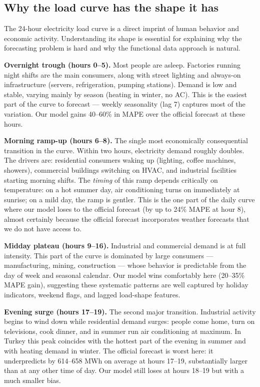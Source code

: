 \documentclass[11pt,a4paper]{article}
\begin{document}
\subsection{Why the load curve has the shape it has}

The 24-hour electricity load curve is a direct imprint of human behavior
and economic activity. Understanding its shape is essential for explaining
why the forecasting problem is hard and why the functional data approach
is natural.

\textbf{Overnight trough (hours 0--5).}
Most people are asleep. Factories running night shifts are the main
consumers, along with street lighting and always-on infrastructure
(servers, refrigeration, pumping stations). Demand is low and stable,
varying mainly by season (heating in winter, no AC). This is the easiest
part of the curve to forecast --- weekly seasonality (lag 7) captures most
of the variation. Our model gains 40--60\% in MAPE over the official
forecast at these hours.

\textbf{Morning ramp-up (hours 6--8).}
The single most economically consequential transition in the curve.
Within two hours, electricity demand roughly doubles. The drivers are:
residential consumers waking up (lighting, coffee machines, showers),
commercial buildings switching on HVAC, and industrial facilities
starting morning shifts. The \emph{timing} of this ramp depends
critically on temperature: on a hot summer day, air conditioning turns
on immediately at sunrise; on a mild day, the ramp is gentler.
This is the one part of the daily curve where our model loses to the
official forecast (by up to 24\% MAPE at hour 8), almost certainly
because the official forecast incorporates weather forecasts that
we do not have access to.

\textbf{Midday plateau (hours 9--16).}
Industrial and commercial demand is at full intensity.
This part of the curve is dominated by large consumers ---
manufacturing, mining, construction --- whose behavior is
predictable from the day of week and seasonal calendar.
Our model wins comfortably here (20--35\% MAPE gain),
suggesting these systematic patterns are well captured by
holiday indicators, weekend flags, and lagged load-shape features.

\textbf{Evening surge (hours 17--19).}
The second major transition. Industrial activity begins to wind
down while residential demand surges: people come home, turn on
televisions, cook dinner, and in summer run air conditioning at
maximum. In Turkey this peak coincides with the hottest part of
the evening in summer and with heating demand in winter. The official
forecast is worst here: it underpredicts by 614--658 MWh on average
at hours 17--19, substantially larger than at any other time of day.
Our model still loses at hours 18--19 but with a much smaller bias.
\end{document}
